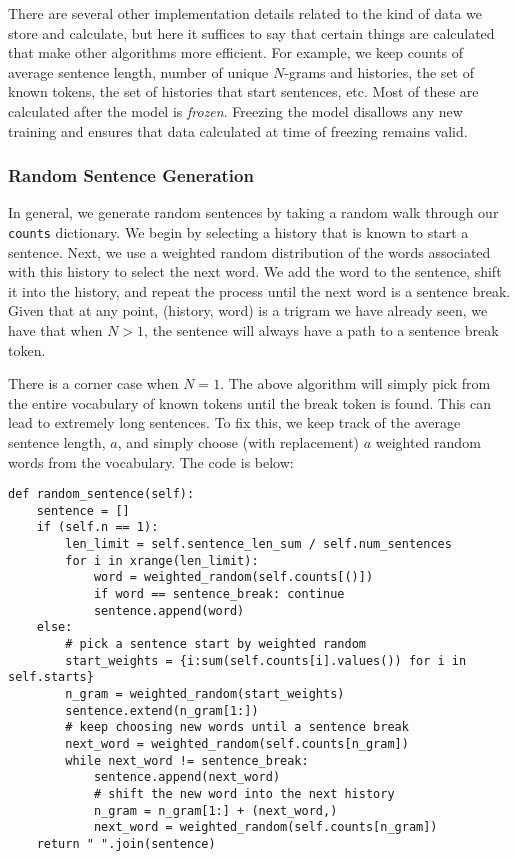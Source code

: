 \documentclass[12pt]{article}
\begin{document}
There are several other implementation details related to the kind of data we store and calculate, but here it suffices to say that certain things are calculated that make other algorithms more efficient. For example, we keep counts of average sentence length, number of unique $N$-grams and histories, the set of known tokens, the set of histories that start sentences, etc. Most of these are calculated after the model is \emph{frozen}. Freezing the model disallows any new training and ensures that data calculated at time of freezing remains valid.

\subsubsection{Random Sentence Generation}
In general, we generate random sentences by taking a random walk through our \verb|counts| dictionary. We begin by selecting a history that is known to start a sentence. Next, we use a weighted random distribution of the words associated with this history to select the next word. We add the word to the sentence, shift it into the history, and repeat the process until the next word is a sentence break. Given that at any point, (history, word) is a trigram we have already seen, we have that when $N > 1$, the sentence will always have a path to a sentence break token.

There is a corner case when $N = 1$. The above algorithm will simply pick from the entire vocabulary of known tokens until the break token is found. This can lead to extremely long sentences. To fix this, we keep track of the average sentence length, $a$, and simply choose (with replacement) $a$ weighted random words from the vocabulary. The code is below:
\begin{lstlisting}
def random_sentence(self):
	sentence = []
	if (self.n == 1):
		len_limit = self.sentence_len_sum / self.num_sentences
		for i in xrange(len_limit):
			word = weighted_random(self.counts[()])					
			if word == sentence_break: continue
			sentence.append(word)
	else:
		# pick a sentence start by weighted random
		start_weights = {i:sum(self.counts[i].values()) for i in self.starts}
		n_gram = weighted_random(start_weights)
		sentence.extend(n_gram[1:])
		# keep choosing new words until a sentence break
		next_word = weighted_random(self.counts[n_gram])
		while next_word != sentence_break:
			sentence.append(next_word)
			# shift the new word into the next history
			n_gram = n_gram[1:] + (next_word,)
			next_word = weighted_random(self.counts[n_gram])
	return " ".join(sentence)
\end{lstlisting}
\end{document}
